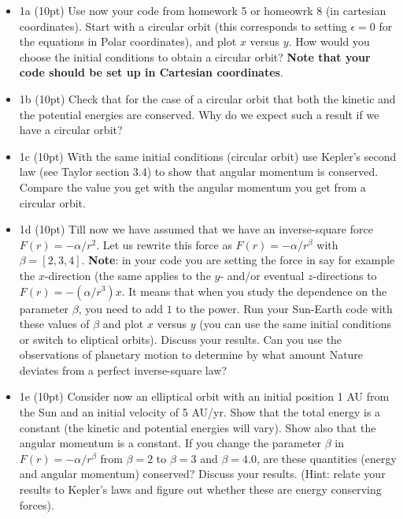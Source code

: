 \documentclass[%
oneside,                 %
final,                   %
10pt]{article}
\begin{document}
\begin{itemize}
\item 1a (10pt) Use now your code from homework 5 or homeowrk 8 (in cartesian coordinates). Start with a circular orbit (this corresponds to  setting $\epsilon=0$ for the equations in Polar coordinates), and plot $x$ versus $y$. How would you choose the initial conditions to obtain a circular orbit?  \textbf{Note that your code should be set up  in Cartesian coordinates}.

\item 1b (10pt) Check that for the case of a circular orbit that both the kinetic and the potential energies are conserved. Why do we expect such a result if we have a circular orbit? 

\item 1c (10pt) With the same initial conditions (circular orbit) use Kepler's second law (see Taylor section 3.4) to show that angular momentum is conserved. Compare the value you get with the angular momentum you get from a circular orbit. 

\item 1d (10pt) Till now we have assumed that we have an inverse-square force $F(r) = -\alpha/r^2$. Let us rewrite this force as $F(r) =-\alpha/r^{\beta}$ with $\beta=[2,3,4]$. \textbf{Note}: in your code you are setting the force in say for example the $x$-direction (the same applies to the $y$- and/or eventual $z$-directions to $F(r) = -(\alpha/r^3)x$. It means that when you study the dependence on the parameter $\beta$, you need to add $1$ to the power. Run your Sun-Earth code with these values of $\beta$ and plot $x$ versus $y$ (you can use the same initial conditions or switch to eliptical orbits). Discuss your results. Can you use the observations of planetary motion to determine by what amount Nature deviates from a perfect inverse-square law? 

\item 1e (10pt) Consider now an elliptical orbit with an initial position 1 AU from the Sun and an initial  velocity of 5 AU/yr. Show that the total energy is a constant (the kinetic and potential energies will vary). Show also that the angular momentum is a constant. If you change the parameter $\beta$ in $F(r) = -\alpha/r^{\beta}$ from $\beta=2$ to $\beta=3$ and $\beta =4.0$, are these quantities (energy and angular momentum) conserved?  Discuss your results. (Hint: relate your results to Kepler's laws and figure out whether these are energy conserving forces). 
\end{itemize}
\end{document}
